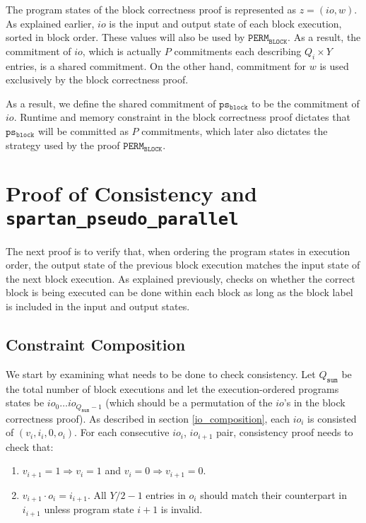 \documentclass{article}
\newcommand{\code}{\texttt}
\newcommand{\Qsum}{Q_{\mathtt{sum}}}
\newcommand{\PERMB}{\mathtt{PERM_{BLOCK}}}
\newcommand{\psb}{\mathtt{ps_{block}}}
\begin{document}
The program states of the block correctness proof is represented as $z = (io, w)$. As explained earlier, $io$ is the input and output state of each block execution, sorted in block order. These values will also be used by $\PERMB$. As a result, the commitment of $io$, which is actually $P$ commitments each describing $Q_i \times Y$ entries, is a shared commitment. On the other hand, commitment for $w$ is used exclusively by the block correctness proof.

As a result, we define the shared commitment of $\psb$ to be the commitment of $io$. Runtime and memory constraint in the block correctness proof dictates that $\psb$ will be committed as $P$ commitments, which later also dictates the strategy used by the proof $\PERMB$.


\section{Proof of Consistency and \code{spartan\_pseudo\_parallel}}\label{sec:consistency}

The next proof is to verify that, when ordering the program states in execution order, the output state of the previous block execution matches the input state of the next block execution. As explained previously, checks on whether the correct block is being executed can be done within each block as long as the block label is included in the input and output states.

\subsection{Constraint Composition}\label{consis_composition}

We start by examining what needs to be done to check consistency. Let $\Qsum$ be the total number of block executions and let the execution-ordered programs states be $io_0 \dots io_{\Qsum - 1}$ (which should be a permutation of the $io$'s in the block correctness proof). As described in section \ref{io_composition}, each $io_i$ is consisted of $(v_i, i_i, 0, o_i)$. For each consecutive $io_i$, $io_{i+1}$ pair, consistency proof needs to check that:
\begin{enumerate}
    \item $v_{i + 1} = 1 \Rightarrow v_i = 1$ and $v_i = 0 \Rightarrow v_{i + 1} = 0$.
    \item $v_{i + 1}\cdot o_i = i_{i + 1}$. All $Y / 2 - 1$ entries in $o_i$ should match their counterpart in $i_{i + 1}$ unless program state $i + 1$ is invalid.
\end{enumerate}
\end{document}
